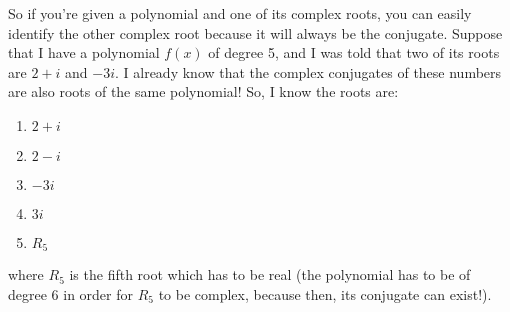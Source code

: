 \documentclass{article}
\begin{document}
\noindent So if you're given a polynomial and one of its complex roots, you can easily identify the other complex root because it will always be the conjugate. Suppose that I have a polynomial $f(x)$ of degree 5, and I was told that two of its roots are $2+i$ and $-3i$. I already know that the complex conjugates of these numbers are also roots of the same polynomial! So, I know the roots are: 

\begin{enumerate}
    \item $2+i$
    \item $2-i$
    \item $-3i$
    \item $3i$
    \item $R_5$
\end{enumerate}
where $R_5$ is the fifth root which has to be real (the polynomial has to be of degree 6 in order for $R_5$ to be complex, because then, its conjugate can exist!).
\end{document}
